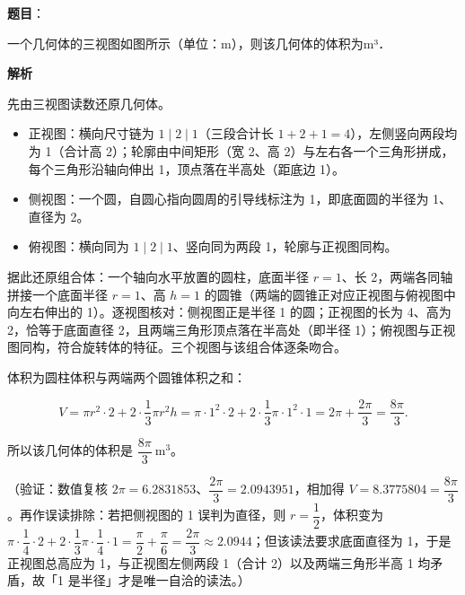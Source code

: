 \begin{answer}

\textbf{题目}：

一个几何体的三视图如图所示（单位：m），则该几何体的体积为\gkblank{}m³．
\nopagebreak[4]
\begin{center}\end{center}
\nopagebreak[4]
\textbf{解析}

先由三视图读数还原几何体。

\begin{itemize}
\item 正视图：横向尺寸链为 \(1\mid 2\mid 1\)（三段合计长 \(1+2+1=4\)），左侧竖向两段均为 1（合计高 2）；轮廓由中间矩形（宽 2、高 2）与左右各一个三角形拼成，每个三角形沿轴向伸出 1，顶点落在半高处（距底边 1）。
\item 侧视图：一个圆，自圆心指向圆周的引导线标注为 1，即底面圆的半径为 1、直径为 2。
\item 俯视图：横向同为 \(1\mid 2\mid 1\)、竖向同为两段 1，轮廓与正视图同构。
\end{itemize}

据此还原组合体：一个轴向水平放置的圆柱，底面半径 \(r=1\)、长 2，两端各同轴拼接一个底面半径 \(r=1\)、高 \(h=1\) 的圆锥（两端的圆锥正对应正视图与俯视图中向左右伸出的 1）。逐视图核对：侧视图正是半径 1 的圆；正视图的长为 4、高为 2，恰等于底面直径 2，且两端三角形顶点落在半高处（即半径 1）；俯视图与正视图同构，符合旋转体的特征。三个视图与该组合体逐条吻合。

体积为圆柱体积与两端两个圆锥体积之和：

\nopagebreak[4]
\[
V=\pi r^{2}\cdot 2+2\cdot\dfrac13\pi r^{2}h=\pi\cdot1^{2}\cdot2+2\cdot\dfrac13\pi\cdot1^{2}\cdot1=2\pi+\dfrac{2\pi}{3}=\dfrac{8\pi}{3}.
\]

所以该几何体的体积是 \(\dfrac{8\pi}{3}\ \mathrm{m}^{3}\)。

（验证：数值复核 \(2\pi=6.2831853\)、\(\dfrac{2\pi}{3}=2.0943951\)，相加得 \(V=8.3775804=\dfrac{8\pi}{3}\)。再作误读排除：若把侧视图的 1 误判为直径，则 \(r=\dfrac12\)，体积变为 \(\pi\cdot\dfrac14\cdot2+2\cdot\dfrac13\pi\cdot\dfrac14\cdot1=\dfrac{\pi}{2}+\dfrac{\pi}{6}=\dfrac{2\pi}{3}\approx2.0944\)；但该读法要求底面直径为 1，于是正视图总高应为 1，与正视图左侧两段 1（合计 2）以及两端三角形半高 1 均矛盾，故「1 是半径」才是唯一自洽的读法。）


\end{answer}
